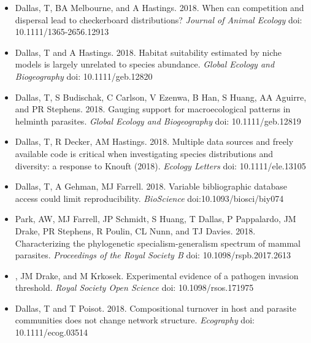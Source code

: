 \documentclass[]{CV}
\begin{document}
{}
\begin{itemize}

\item {\mefont Dallas, T}, BA Melbourne, and A Hastings. 2018. When can competition and dispersal lead to checkerboard distributions? \textit{Journal of Animal Ecology} doi: 10.1111/1365-2656.12913

\item {\mefont Dallas, T} and A Hastings. 2018. Habitat suitability estimated by niche models is largely unrelated to species abundance. \textit{Global Ecology and Biogeography} doi: 10.1111/geb.12820

\item {\mefont Dallas, T}, S Budischak, C Carlson, V Ezenwa, B Han, S Huang, AA Aguirre, and PR Stephens. 2018. Gauging support for macroecological patterns in helminth parasites. \textit{Global Ecology and Biogeography} doi: 10.1111/geb.12819


\item {\mefont Dallas, T}, R Decker, AM Hastings. 2018. Multiple data sources and freely available code is critical when investigating species distributions and diversity: a response to Knouft (2018). \textit{Ecology Letters} doi: 10.1111/ele.13105

\item {\mefont Dallas, T}, A Gehman, MJ Farrell. 2018. Variable bibliographic database access could limit reproducibility. \textit{BioScience} doi:10.1093/biosci/biy074

\item Park, AW, MJ Farrell, JP Schmidt, S Huang, {\mefont T Dallas}, P Pappalardo, JM Drake, PR Stephens, R Poulin, CL Nunn, and TJ Davies. 2018. Characterizing the phylogenetic specialism-generalism spectrum of mammal parasites. \textit{Proceedings of the Royal Society B} doi: 10.1098/rspb.2017.2613

\item {}, JM Drake, and M Krkosek. Experimental evidence of a pathogen invasion threshold. \textit{Royal Society Open Science} doi: 10.1098/rsos.171975

\item {\mefont Dallas, T} and T Poisot. 2018. Compositional turnover in host and parasite communities does not change network structure. \textit{Ecography} doi: 10.1111/ecog.03514

\end{itemize}
\end{document}
